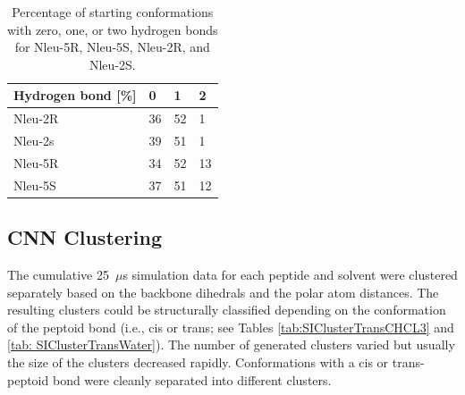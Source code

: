 \begin{table}[h!]
\centering
\caption{Percentage of starting conformations with zero, one, or two hydrogen bonds for Nleu-5R, Nleu-5S, Nleu-2R, and Nleu-2S.}
\label{tab: SIhbondAmountRatios}
  \begin{adjustbox}{max width=\textwidth}
\begin{tabular}{llll}
Hydrogen bond {[}\%{]} & 0      & 1          & 2        \\
    \hline
Nleu-2R        & 36             & 52         &  1       \\
Nleu-2s        & 39             & 51         &  1       \\
Nleu-5R        & 34             & 52         &  13      \\
Nleu-5S        & 37             & 51         &  12  \\
   \hline

\end{tabular}%
\end{adjustbox}
\end{table}

\FloatBarrier

\subsection{CNN Clustering} 
The cumulative 25~$\mu$s simulation data for each peptide and solvent were clustered separately based on the backbone dihedrals and the polar atom distances. The resulting clusters could be structurally classified depending on the conformation of the peptoid bond (i.e., cis or trans; see Tables \ref{tab:SIClusterTransCHCL3} and \ref{tab: SIClusterTransWater}). The number of generated clusters varied but usually the size of the clusters decreased rapidly. Conformations with a cis or trans-peptoid bond were cleanly separated into different clusters.

